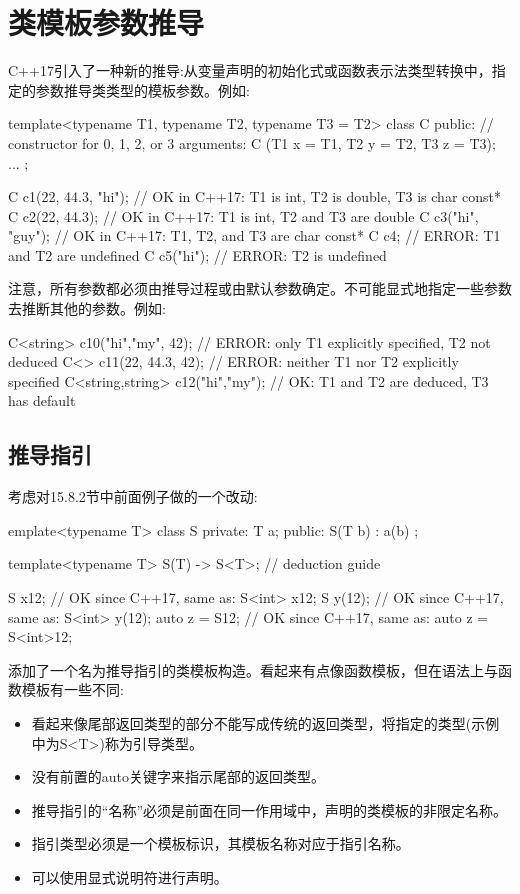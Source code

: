 \section{类模板参数推导}

C++17引入了一种新的推导:从变量声明的初始化式或函数表示法类型转换中，指定的参数推导类类型的模板参数。例如:

\begin{cpp}
template<typename T1, typename T2, typename T3 = T2>
class C
{
	public:
	// constructor for 0, 1, 2, or 3 arguments:
	C (T1 x = T1{}, T2 y = T2{}, T3 z = T3{});
	...
};

C c1(22, 44.3, "hi"); // OK in C++17: T1 is int, T2 is double, T3 is char const*
C c2(22, 44.3); // OK in C++17: T1 is int, T2 and T3 are double
C c3("hi", "guy"); // OK in C++17: T1, T2, and T3 are char const*
C c4; // ERROR: T1 and T2 are undefined
C c5("hi"); // ERROR: T2 is undefined
\end{cpp}

注意，所有参数都必须由推导过程或由默认参数确定。不可能显式地指定一些参数去推断其他的参数。例如:

\begin{cpp}
C<string> c10("hi","my", 42); // ERROR: only T1 explicitly specified, T2 not deduced
C<> c11(22, 44.3, 42); // ERROR: neither T1 nor T2 explicitly specified
C<string,string> c12("hi","my"); // OK: T1 and T2 are deduced, T3 has default
\end{cpp}

\subsection{推导指引}

考虑对15.8.2节中前面例子做的一个改动:

\begin{cpp}
emplate<typename T>
class S {
	private:
	T a;
	public:
	S(T b) : a(b) {
	}
};

template<typename T> S(T) -> S<T>; // deduction guide

S x{12}; // OK since C++17, same as: S<int> x{12};
S y(12); // OK since C++17, same as: S<int> y(12);
auto z = S{12}; // OK since C++17, same as: auto z = S<int>{12};
\end{cpp}

添加了一个名为推导指引的类模板构造。看起来有点像函数模板，但在语法上与函数模板有一些不同:

\begin{itemize}
\item 
看起来像尾部返回类型的部分不能写成传统的返回类型，将指定的类型(示例中为S<T>)称为引导类型。

\item 
没有前置的auto关键字来指示尾部的返回类型。

\item 
推导指引的“名称”必须是前面在同一作用域中，声明的类模板的非限定名称。

\item 
指引类型必须是一个模板标识，其模板名称对应于指引名称。

\item 
可以使用显式说明符进行声明。
\end{itemize}	

